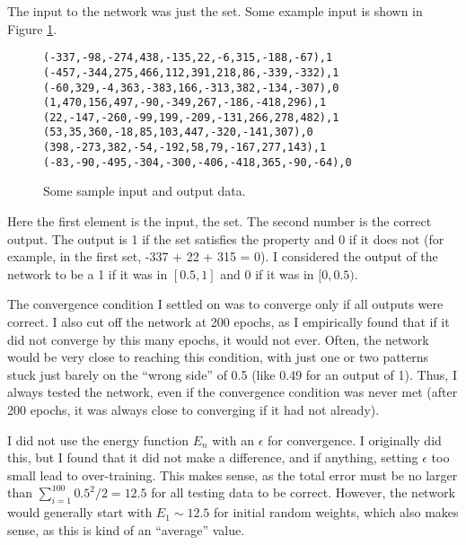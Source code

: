 \documentclass[12pt]{article}
\begin{document}
The input to the network was just the set.  Some example input is shown in Figure \ref{Example-Input}.
\begin{figure}[h]
\begin{alltt}
    (-337, -98, -274, 438, -135, 22, -6, 315, -188, -67), 1\\
    (-457, -344, 275, 466, 112, 391, 218, 86, -339, -332), 1\\
    (-60, 329, -4, 363, -383, 166, -313, 382, -134, -307), 0\\
    (1, 470, 156, 497, -90, -349, 267, -186, -418, 296), 1\\
    (22, -147, -260, -99, 199, -209, -131, 266, 278, 482), 1\\
    (53, 35, 360, -18, 85, 103, 447, -320, -141, 307), 0\\
    (398, -273, 382, -54, -192, 58, 79, -167, 277, 143), 1\\
    (-83, -90, -495, -304, -300, -406, -418, 365, -90, -64), 0
\end{alltt}
\caption{Some sample input and output data.}
\label{Example-Input}
\end{figure}
Here the first element is the input, the set.  The second number is the correct output.  The output is 1 if the set satisfies the property and 0 if it does not (for example, in the first set, -337 + 22 + 315 = 0). I considered the output of the network to be a 1 if it was in $[0.5, 1]$ and 0 if it was in $[0, 0.5)$.

The convergence condition I settled on was to converge only if all outputs were correct.  I also cut off the network at 200 epochs, as I empirically found that if it did not converge by this many epochs, it would not ever.  Often, the network would be very close to reaching this condition, with just one or two patterns stuck just barely on the ``wrong side'' of 0.5 (like 0.49 for an output of 1).  Thus, I always tested the network, even if the convergence condition was never met (after 200 epochs, it was always close to converging if it had not already).

I did not use the energy function $E_n$ with an $\epsilon$ for convergence.  I originally did this, but I found that it did not make a difference, and if anything, setting $\epsilon$ too small lead to over-training.  This makes sense, as the total error must be no larger than $\sum_{i=1}^{100}{0.5^2}/2=12.5$ for all testing data to be correct.  However, the network would generally start with $E_1 \sim 12.5$ for initial random weights, which also makes sense, as this is kind of an ``average'' value.
\end{document}
